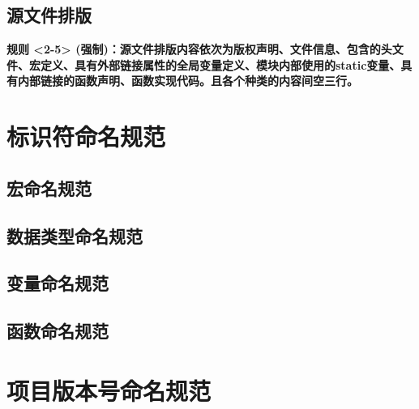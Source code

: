\documentclass[UTF8,a4paper,12pt]{article}
\begin{document}
	\subsection{源文件排版}
	\textbf{规则 <2-5> (强制)：源文件排版内容依次为版权声明、文件信息、包含的头文件、宏定义、具有外部链接属性的全局变量定义、模块内部使用的static变量、具有内部链接的函数声明、函数实现代码。且各个种类的内容间空三行。}
	\newpage
		
	\section{标识符命名规范}
	\subsection{宏命名规范}
	\subsection{数据类型命名规范}
	\subsection{变量命名规范}
	\subsection{函数命名规范}
	\newpage
	
	\section{项目版本号命名规范}
\end{document}

